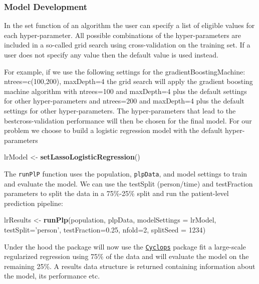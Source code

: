 \documentclass[]{book}
\newenvironment{Shaded}{\begin{snugshade}}{\end{snugshade}}
\newcommand{\KeywordTok}[1]{\textcolor[rgb]{0.13,0.29,0.53}{\textbf{#1}}}
\newcommand{\DataTypeTok}[1]{\textcolor[rgb]{0.13,0.29,0.53}{#1}}
\newcommand{\DecValTok}[1]{\textcolor[rgb]{0.00,0.00,0.81}{#1}}
\newcommand{\FloatTok}[1]{\textcolor[rgb]{0.00,0.00,0.81}{#1}}
\newcommand{\StringTok}[1]{\textcolor[rgb]{0.31,0.60,0.02}{#1}}
\newcommand{\NormalTok}[1]{#1}
\begin{document}
\subsubsection{Model Development}\label{model-development}

In the set function of an algorithm the user can specify a list of
eligible values for each hyper-parameter. All possible combinations of
the hyper-parameters are included in a so-called grid search using
cross-validation on the training set. If a user does not specify any
value then the default value is used instead.

For example, if we use the following settings for the
gradientBoostingMachine: ntrees=c(100,200), maxDepth=4 the grid search
will apply the gradient boosting machine algorithm with ntrees=100 and
maxDepth=4 plus the default settings for other hyper-parameters and
ntrees=200 and maxDepth=4 plus the default settings for other
hyper-parameters. The hyper-parameters that lead to the
bestcross-validation performance will then be chosen for the final
model. For our problem we choose to build a logistic regression model
with the default hyper-parameters

\begin{Shaded}
\begin{Highlighting}[]
\NormalTok{lrModel <-}\StringTok{ }\KeywordTok{setLassoLogisticRegression}\NormalTok{()}
\end{Highlighting}
\end{Shaded}

The \texttt{runPlP} function uses the population, \texttt{plpData}, and
model settings to train and evaluate the model. We can use the testSplit
(person/time) and testFraction parameters to split the data in a
75\%-25\% split and run the patient-level prediction pipeline:

\begin{Shaded}
\begin{Highlighting}[]
\NormalTok{lrResults <-}\StringTok{ }\KeywordTok{runPlp}\NormalTok{(population, plpData, }\DataTypeTok{modelSettings =}\NormalTok{ lrModel, }\DataTypeTok{testSplit=}\StringTok{'person'}\NormalTok{,}
                    \DataTypeTok{testFraction=}\FloatTok{0.25}\NormalTok{, }\DataTypeTok{nfold=}\DecValTok{2}\NormalTok{, }\DataTypeTok{splitSeed =} \DecValTok{1234}\NormalTok{)}
\end{Highlighting}
\end{Shaded}

Under the hood the package will now use the
\href{http://github.com/OHDSI/Cyclops}{\texttt{Cyclops}} package fit a
large-scale regularized regression using 75\% of the data and will
evaluate the model on the remaining 25\%. A results data structure is
returned containing information about the model, its performance etc.
\end{document}
